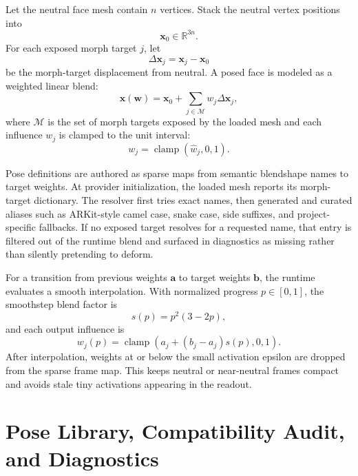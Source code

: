 \documentclass[11pt]{article}
\newcommand{\R}{\mathbb{R}}
\newcommand{\clamp}{\operatorname{clamp}}
\begin{document}
Let the neutral face mesh contain $n$ vertices.  Stack the neutral vertex positions into
\begin{equation}
  \mathbf{x}_0 \in \R^{3n}.
\end{equation}
For each exposed morph target $j$, let
\begin{equation}
  \Delta \mathbf{x}_j = \mathbf{x}_j - \mathbf{x}_0
\end{equation}
be the morph-target displacement from neutral.  A posed face is modeled as a weighted linear blend:
\begin{equation}
  \mathbf{x}(\mathbf{w}) = \mathbf{x}_0 + \sum_{j \in \mathcal{M}} w_j \Delta \mathbf{x}_j,
  \label{eq:blendshape-linear}
\end{equation}
where $\mathcal{M}$ is the set of morph targets exposed by the loaded mesh and each influence $w_j$ is clamped to the unit interval:
\begin{equation}
  w_j = \clamp(\hat{w}_j, 0, 1).
\end{equation}

Pose definitions are authored as sparse maps from semantic blendshape names to target weights.  At provider initialization, the loaded mesh reports its morph-target dictionary.  The resolver first tries exact names, then generated and curated aliases such as ARKit-style camel case, snake case, side suffixes, and project-specific fallbacks.  If no exposed target resolves for a requested name, that entry is filtered out of the runtime blend and surfaced in diagnostics as missing rather than silently pretending to deform.

For a transition from previous weights $\mathbf{a}$ to target weights $\mathbf{b}$, the runtime evaluates a smooth interpolation.  With normalized progress $p \in [0,1]$, the smoothstep blend factor is
\begin{equation}
  s(p) = p^2(3 - 2p),
\end{equation}
and each output influence is
\begin{equation}
  w_j(p) = \clamp\left(a_j + \left(b_j-a_j\right)s(p), 0, 1\right).
  \label{eq:smoothstep-weight}
\end{equation}
After interpolation, weights at or below the small activation epsilon are dropped from the sparse frame map.  This keeps neutral or near-neutral frames compact and avoids stale tiny activations appearing in the readout.

\section{Pose Library, Compatibility Audit, and Diagnostics}
\end{document}
